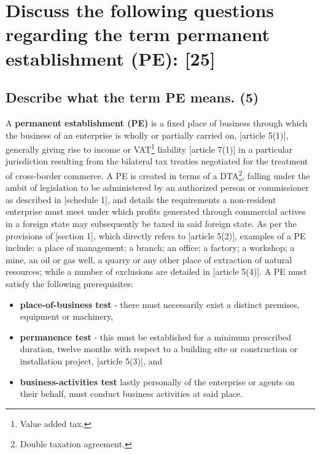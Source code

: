 \documentclass[11pt]{article}
\begin{document}
\section{Discuss the following questions regarding the term permanent establishment (PE): [25]}
\label{sec:org1c6132a}

\subsection{Describe what the term PE means. (5)}
\label{sec:org6f6ceda}

A \textbf{permanent establishment (PE)} is a fixed place of business through which the
business of an enterprise is wholly or partially carried on, [article
5(1)]\cite{oecd17_model_tax}, generally giving rise to income or VAT\footnote{Value
added tax.} liability [article 7(1)]\cite{oecd17_model_tax} in a particular jurisdiction
resulting from the bilateral tax treaties negotiated for the treatment of
cross-border commerce. A PE is created in terms of a DTA\footnote{Double taxation
agreement.}, falling under the ambit of legislation to be administered by
an authorized person or commissioner as described in [schedule
1]\cite{rsa97_sars_act}, and details the requirements a non-resident enterprise
must meet under which profits generated through commercial actives in a foreign
state may subsequently be taxed in said foreign state. As per the provisions of
[section 1]\cite{rsa62_income_tax}, which directly refers to [article
5(2)]\cite{oecd17_model_tax}, examples of a PE include: a place of management; a
branch; an office; a factory; a workshop; a mine, an oil or gas well, a quarry
or any other place of extraction of natural resources; while a number of
exclusions are detailed in [article 5(4)]\cite{oecd17_model_tax}. A PE must satisfy the following prerequisites:
\begin{itemize}
\item \textbf{place-of-business test} - there must necessarily exist a distinct premises,
equipment or machinery,
\item \textbf{permanence test} - this must be established for a minimum prescribed
duration, twelve months with respect to a building site or construction or
installation project, [article 5(3)]\cite{oecd17_model_tax}, and
\item \textbf{business-activities test} lastly personally of the enterprise or agents on
their behalf, must conduct business activities at said place.
\end{itemize}
\end{document}
